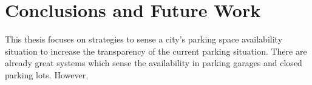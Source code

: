 \chapter{Conclusions and Future Work}
\label{chap:conclusion}



This thesis focuses on strategies to sense a city's parking space availability situation to increase the transparency of the current parking situation. There are already great systems which sense the availability in parking garages and closed parking lots. However, 